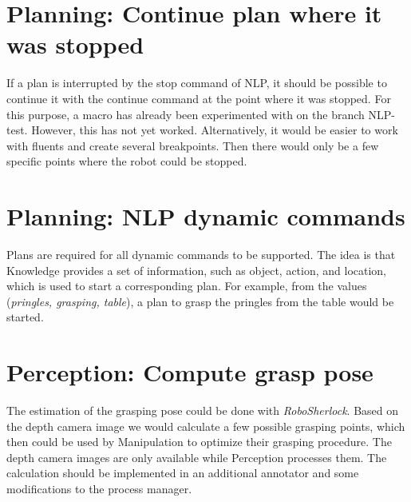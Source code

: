 \documentclass[main.tex]{subfiles}
\begin{document}
		\section{Planning: Continue plan where it was stopped}
		If a plan is interrupted by the stop command of NLP, it should be possible to continue it with the continue command at the point where it was stopped. For this purpose, a macro has already been experimented with on the branch NLP-test. However, this has not yet worked. Alternatively, it would be easier to work with fluents and create several breakpoints. Then there would only be a few specific points where the robot could be stopped.
		
		\section{Planning: NLP dynamic commands}
		Plans are required for all dynamic commands to be supported. The idea is that Knowledge provides a set of information, such as object, action, and location, which is used to start a corresponding plan. For example, from the values (\textit{pringles, grasping, table}), a plan to grasp the pringles from the table would be started.
		
		\section{Perception: Compute grasp pose}
		The estimation of the grasping pose could be done with \textit{RoboSherlock}. Based on the depth camera image we would calculate a few possible grasping points, which then could be used by Manipulation to optimize their grasping procedure. The depth camera images are only available while Perception processes them. The calculation should be implemented in an additional annotator and some modifications to the process manager.
		
\end{document}
